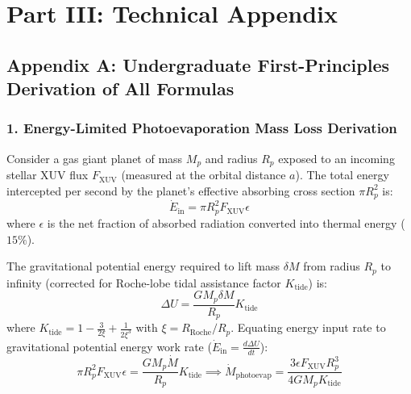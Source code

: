 \documentclass[11pt,a4paper]{article}
\begin{document}
\newpage

\section*{Part III: Technical Appendix}

\subsection*{Appendix A: Undergraduate First-Principles Derivation of All Formulas}

\subsubsection*{1. Energy-Limited Photoevaporation Mass Loss Derivation}
Consider a gas giant planet of mass $M_p$ and radius $R_p$ exposed to an incoming stellar XUV flux $F_{\text{XUV}}$ (measured at the orbital distance $a$). The total energy intercepted per second by the planet's effective absorbing cross section $\pi R_p^2$ is:
\begin{equation}
\dot{E}_{\text{in}} = \pi R_p^2 F_{\text{XUV}} \epsilon
\end{equation}
where $\epsilon$ is the net fraction of absorbed radiation converted into thermal energy ($15\%$).

The gravitational potential energy required to lift mass $\delta M$ from radius $R_p$ to infinity (corrected for Roche-lobe tidal assistance factor $K_{\text{tide}}$) is:
\begin{equation}
\Delta U = \frac{G M_p \delta M}{R_p} K_{\text{tide}}
\end{equation}
where $K_{\text{tide}} = 1 - \frac{3}{2\xi} + \frac{1}{2\xi^3}$ with $\xi = R_{\text{Roche}} / R_p$.
Equating energy input rate to gravitational potential energy work rate ($\dot{E}_{\text{in}} = \frac{d\Delta U}{dt}$):
\begin{equation}
\pi R_p^2 F_{\text{XUV}} \epsilon = \frac{G M_p \dot{M}}{R_p} K_{\text{tide}} \implies \dot{M}_{\text{photoevap}} = \frac{3 \epsilon F_{\text{XUV}} R_p^3}{4 G M_p K_{\text{tide}}}
\end{equation}
\end{document}
